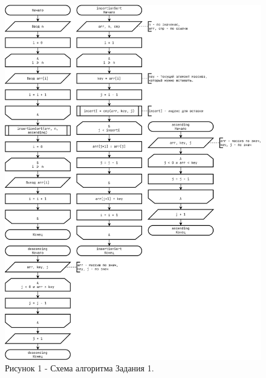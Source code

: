 \documentclass[oneside,a4paper,14pt]{extarticle}
\begin{document}
\clearpage
\begin{figure}[H]
	\centering
	\includegraphics[height=0.9\textheight]{pics/flowchart1.png}
	\caption*{Рисунок 1 - Схема алгоритма Задания 1.}
\end{figure}
\end{document}
